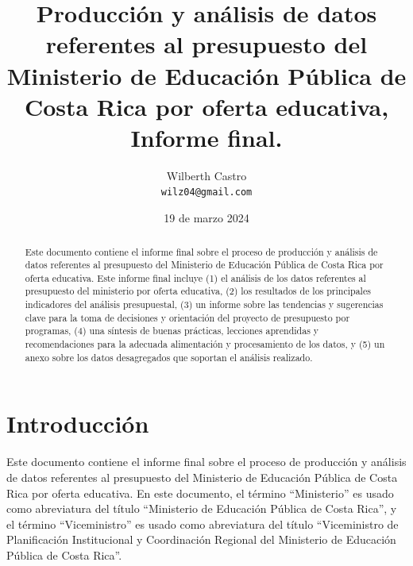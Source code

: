 \documentclass[a4paper, 9pt, conference]{article}
\begin{document}
\title{Producci\'on y an\'alisis de datos referentes al presupuesto del Ministerio de Educaci\'on P\'ublica de Costa Rica por oferta educativa, Informe final.}

\author{
	Wilberth Castro \\
	\small{\texttt{wilz04@gmail.com}}
}

\date{\small{19 de marzo 2024}}

\maketitle


\begin{abstract}
	Este documento contiene el informe final sobre el proceso de producci\'on y an\'alisis de datos referentes al presupuesto del Ministerio de Educaci\'on P\'ublica de Costa Rica por oferta educativa. Este informe final incluye (1) el an\'alisis de los datos referentes al presupuesto del ministerio por oferta educativa, (2) los resultados de los principales indicadores del an\'alisis presupuestal, (3) un informe sobre las tendencias y sugerencias clave para la toma de decisiones y orientaci\'on del proyecto de presupuesto por programas, (4) una s\'intesis de buenas pr\'acticas, lecciones aprendidas y recomendaciones para la adecuada alimentaci\'on y procesamiento de los datos, y (5) un anexo sobre los datos desagregados que soportan el an\'alisis realizado.%
\end{abstract}

\section{Introducci\'on} \label{sec:intro}

Este documento contiene el informe final sobre el proceso de producci\'on y an\'alisis de datos referentes al presupuesto del Ministerio de Educaci\'on P\'ublica de Costa Rica por oferta educativa. En este documento, el t\'ermino ``Ministerio'' es usado como abreviatura del t\'itulo ``Ministerio de Educaci\'on P\'ublica de Costa Rica'', y el t\'ermino ``Viceministro'' es usado como abreviatura del t\'itulo ``Viceministro de Planificaci\'on Institucional y Coordinaci\'on Regional del Ministerio de Educaci\'on P\'ublica de Costa Rica''.
\end{document}
